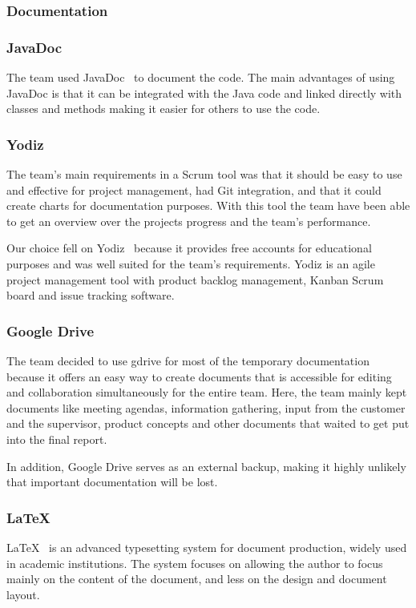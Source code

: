 \subsubsection{Documentation}

\subsubsection{JavaDoc}
The team used JavaDoc~\cite{javadoc} to document the code. The main advantages of using JavaDoc is that it can be integrated with the Java code and linked directly with classes and methods making it easier for others to use the code.

\subsubsection{Yodiz}
The team's main requirements in a Scrum tool was that it should be easy to use and effective for project management, had Git integration, and that it could create charts for documentation purposes. With this tool the team have been able to get an overview over the projects progress and the team's performance. 

Our choice fell on Yodiz~\cite{yodiz} because it provides free accounts for educational purposes and was well suited for the team's requirements. Yodiz is an agile project management tool with product backlog management, Kanban Scrum board and issue tracking software.

\subsubsection{Google Drive}
The team decided to use \gls{gdrive} for most of the temporary documentation because it offers an easy way to create documents that is accessible for editing and collaboration simultaneously for the entire team. Here, the team mainly kept documents like meeting agendas, information gathering, input from the customer and the supervisor, product concepts and other documents that waited to get put into the final report. 

In addition, Google Drive serves as an external backup, making it highly unlikely that important documentation will be lost. 


\subsubsection{\LaTeX}
LaTeX~\cite{latex} is an advanced typesetting system for document production, widely used in
academic institutions. The system focuses on allowing the author to focus mainly on the content of the document, and less on the design and document layout.

